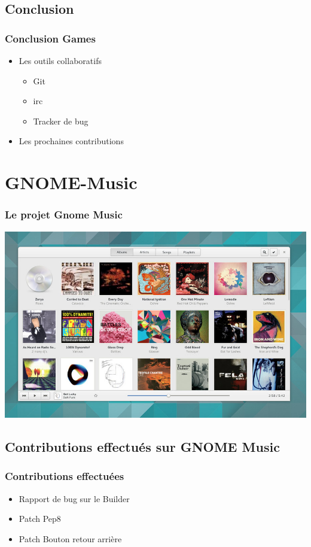 \documentclass{beamer}
\begin{document}
\subsection{Conclusion}
\begin{frame}
  \frametitle{Conclusion Games}
  \begin{itemize}
  \item Les outils collaboratifs \pause
    \begin{itemize}
    \item Git \pause
    \item irc \pause
    \item Tracker de bug \pause
    \end{itemize}
  \item Les prochaines contributions
  \end{itemize}
\end{frame}

\section{GNOME-Music}
\begin{frame}
  \frametitle{Le projet Gnome Music}
  \includegraphics[scale=0.325]{images/gnome-music-app.png}
\end{frame}

\subsection{Contributions effectués sur GNOME Music}
\begin{frame}
  \frametitle{Contributions effectuées}
  \begin{itemize}
  \item Rapport de bug sur le Builder
  \item Patch Pep8
  \item Patch Bouton retour arrière
  \end{itemize}
\end{frame}
\end{document}
